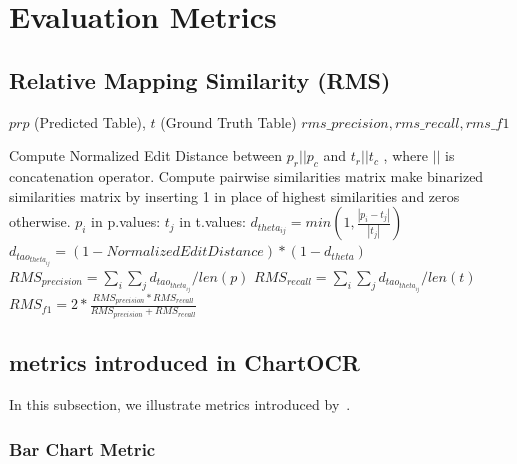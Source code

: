 \documentclass[
	letterpaper, %
]{jdf}
\begin{document}
\appendix
\section{Evaluation Metrics}\label{app:metrics}
\subsection{Relative Mapping Similarity (RMS)}\label{app:rms-algorithm}
\begin{algorithm}
    \begin{algorithmic}[1]
 \Require $prp$ (Predicted Table), $t$ (Ground Truth Table)
        \Ensure $rms\_precision, rms\_recall, rms\_f1$

        Compute Normalized Edit Distance between $p_r || p_c$ and $t_r || t_c$
    , where $||$ is concatenation operator.
        Compute pairwise similarities matrix
        make binarized similarities matrix by inserting 1 in place of highest similarities and zeros otherwise.
        \For $p_i$ in p.values:
        \For $t_j$ in t.values:
        $d_{theta_{ij}} = min(1, \frac{|p_i - t_j|}{|t_j|})$
        $d_{tao_{theta_{ij}}} = (1-Normalized Edit Distance) * (1-d_{theta})$
        \EndFor
        \EndFor
        $RMS_{precision} = \sum_{i} \sum_j d_{tao_{theta_{ij}}} / len(p)$
        $RMS_{recall} = \sum_{i} \sum_j d_{tao_{theta_{ij}}} / len(t)$
        $RMS_{f1} = 2 * \frac{RMS_{precision} * RMS_{recall}}{RMS_{precision} + RMS_{recall}}$
    \end{algorithmic}
\end{algorithm}
\subsection{metrics introduced in ChartOCR}\label{ssect:chartocr-metrics}
In this subsection, we illustrate metrics introduced by~\cite{luo2021chartocr}.
\subsubsection{Bar Chart Metric}
\end{document}
